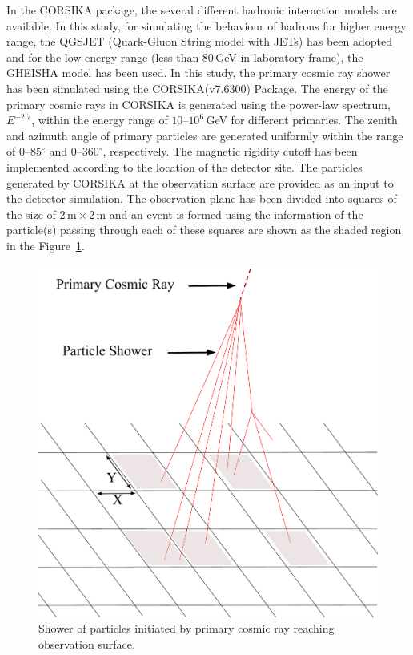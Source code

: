 \documentclass[a4paper,12pt,twoside,openany]{article}
\begin{document}
In the CORSIKA package, the several different hadronic interaction
models are available. In this study, for simulating the behaviour of
hadrons for higher energy range, the QGSJET (Quark-Gluon String model
with JETs) \cite{corsika763} has been adopted and for the low energy
range (less than 80\,GeV in laboratory frame), the GHEISHA model has
been used. In this study, the primary cosmic ray shower has been
simulated using the CORSIKA(v7.6300) Package. The energy of the
primary cosmic rays in CORSIKA is generated using the power-law
spectrum, $E^{-2.7}$, within the energy range of
\mbox{$10$--$10^{6}$\,GeV} for different primaries. The zenith and
azimuth angle of primary particles are generated uniformly within the
range of \mbox{$0$--$85^\circ$} and \mbox{$0$--$360^\circ$},
respectively. The magnetic rigidity cutoff has been implemented
according to the location of the detector site. The particles
generated by CORSIKA at the observation surface are provided as an
input to the detector simulation. The observation plane has been
divided into squares of the size of 2\,m\,$\times$\,2\,m and an event
is formed using the information of the particle(s) passing through
each of these squares are shown as the shaded region in the
Figure~\ref{fig:eas}.
\begin{figure}
  \centering
  \includegraphics[width=0.99\linewidth]{EAS.pdf} 
  \caption{Shower of particles initiated by primary cosmic ray
    reaching observation surface.}
  \label{fig:eas}
\end{figure}
\end{document}
